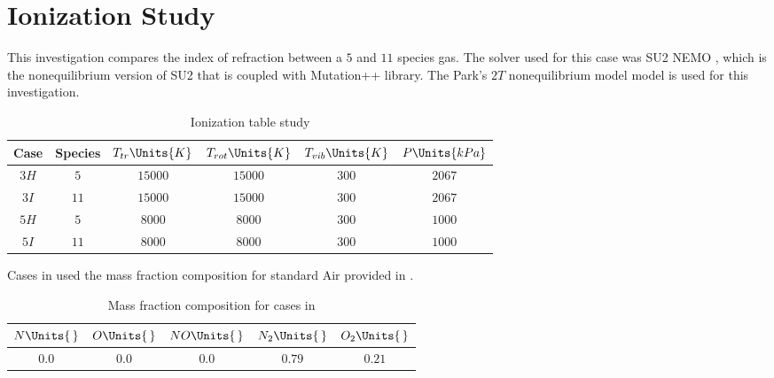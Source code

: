 \section{Ionization Study\label{ch4:ionizationStudy}}
    This investigation compares the index of refraction between a $5$ and $11$
    species gas. The solver used for this case was \gls{SU2} \gls{NEMO}
    \cite{Maier2021}, which is the nonequilibrium version of \gls{SU2} that is
    coupled with \gls{Mutation++} \cite{Scoggins2014} library. The
    Park's $2T$ nonequilibrium model \cite{Park1989} model is used for this
    investigation. 

    \begin{table}[H]
        \centering
        \begin{tabular}{|c|c|c|c|c|c|}
            \hline
            Case & Species & $T_{tr}\Units{K}$ & $T_{rot}\Units{K}$ &
            $T_{vib}\Units{K}$ & $P\Units{kPa}$ \\
            \hline \hline
            $3H$\cite{Gimelshein2022} & $5$ & $15000$ & $15000$ & $300$ & $2067$
            \\ \hline
            $3I$ & $11$ & $15000$ & $15000$ & $300$ & $2067$ \\ \hline
            $5H$ & $5$ & $8000$ & $8000$ & $300$ & $1000$ \\ \hline
            $5I$ & $11$ & $8000$ & $8000$ & $300$ & $1000$ \\ \hline
        \end{tabular}
        \caption{Ionization table study}\label{tab:ionizationTableStudy}
    \end{table}

    Cases in  used the mass fraction
    composition for standard Air provided in
    .
    \begin{table}[H]
        \centering
        \begin{tabular}{|c|c|c|c|c|}
            \hline
            $N\Units{\,}$ & $O\Units{\,}$ & $NO\Units{\,}$ & $N_2\Units{\,}$ &
            $O_2\Units{\,}$ \\ \hline\hline
            $0.0$ & $0.0$ & $0.0$ & $0.79$ & $0.21$ \\ \hline
        \end{tabular}
        \caption{Mass fraction composition for cases in
        \label{tab:massFractionCompositionIonizationStudy}}
    \end{table}

